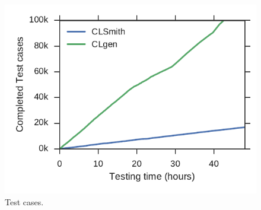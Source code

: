 \begin{figure}
	\centering %
	\includegraphics[width=\columnwidth]{build/img/total-tests}%
	\caption{%
		Test cases. %
	}%
	\label{fig:total-tests} %
\end{figure}